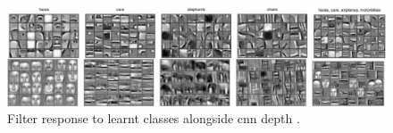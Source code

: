
\begin{figure}[h]
    \centering
    \scriptsize
    \includegraphics[width=\textwidth]{fig/rel/images/conv_layers.png}
    \caption{Filter response to learnt classes alongside \gls{cnn} depth \autocite{lee2009convolutional}.}
    \label{fig:cnn_depth}
\end{figure}